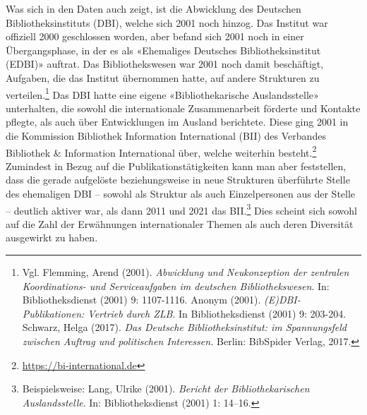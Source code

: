\documentclass[a4paper,
fontsize=11pt,
oneside,
numbers=noperiodatend,
parskip=half-,
bibliography=totoc,
final
]{scrartcl}
\begin{document}
Was sich in den Daten auch zeigt, ist die Abwicklung des Deutschen
Bibliotheksinstituts (DBI), welche sich 2001 noch hinzog. Das Institut
war offiziell 2000 geschlossen worden, aber befand sich 2001 noch in
einer Übergangsphase, in der es als «Ehemaliges Deutsches
Bibliotheksinstitut (EDBI)» auftrat. Das Bibliothekswesen war 2001 noch
damit beschäftigt, Aufgaben, die das Institut übernommen hatte, auf
andere Strukturen zu verteilen.\footnote{Vgl. Flemming, Arend (2001).
  \emph{Abwicklung und Neukonzeption der zentralen Koordinations- und
  Serviceaufgaben im deutschen Bibliothekswesen}. In: Bibliotheksdienst
  (2001) 9: 1107-1116. Anonym (2001). \emph{(E)DBI-Publikationen:
  Vertrieb durch ZLB}. In Bibliotheksdienst (2001) 9: 203-204. Schwarz,
  Helga (2017). \emph{Das Deutsche Bibliotheksinstitut: im Spannungsfeld
  zwischen Auftrag und politischen Interessen.} Berlin: BibSpider
  Verlag, 2017.} Das DBI hatte eine eigene «Bibliothekarische
Auslandsstelle» unterhalten, die sowohl die internationale
Zusammenarbeit förderte und Kontakte pflegte, als auch über
Entwicklungen im Ausland berichtete. Diese ging 2001 in die Kommission
Bibliothek Information International (BII) des Verbandes Bibliothek \&
Information International über, welche weiterhin besteht.\footnote{\url{https://bi-international.de}}
Zumindest in Bezug auf die Publikationstätigkeiten kann man aber
feststellen, dass die gerade aufgelöste beziehungsweise in neue
Strukturen überführte Stelle des ehemaligen DBI -- sowohl als Struktur
als auch Einzelpersonen aus der Stelle -- deutlich aktiver war, als dann
2011 und 2021 das BII.\footnote{Beispielsweise: Lang, Ulrike (2001).
  \emph{Bericht der Bibliothekarischen Auslandsstelle}. In:
  Bibliotheksdienst (2001) 1: 14--16.} Dies scheint sich sowohl auf die
Zahl der Erwähnungen internationaler Themen als auch deren Diversität
ausgewirkt zu haben.
\end{document}
